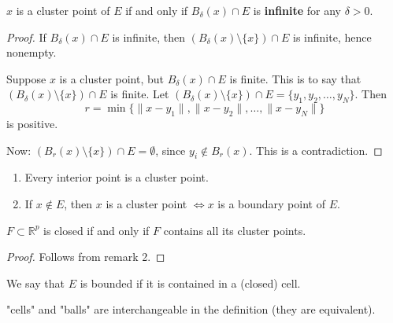 \begin{proposition}
	$x$ is a cluster point of $E$ if and only if $B_{\delta}(x) \cap E$ is \textbf{infinite} for any  $\delta>0$.
\end{proposition}
\begin{proof}
	If $B_\delta(x) \cap E$ is infinite, then $ (B_{\delta}(x) \setminus \{x\} ) \cap E$ is infinite, hence nonempty.

	Suppose $x$ is a cluster point, but $B_{\delta}(x)  \cap E$ is finite. This is to say that $(B_{\delta}(x) \setminus \{x\} ) \cap E$ is finite. 
	Let $(B_{\delta}(x) \setminus \{x\} ) \cap E = \{ y_1,y_2,\ldots,y_N\}$. Then \[
		r = \min \{\|x-y_1\|, \|x-y_2\|,\ldots,\|x-y_N\|\}
	\]
	is positive.
	
	Now:  
	$(B_{r}(x) \setminus \{x\} ) \cap E = \emptyset $, since $y_i \not\in B_r(x)$. This is a contradiction.
\end{proof}

\begin{remark}
	\begin{enumerate}
		\item Every interior point is a cluster point. 
		\item If $x \not\in E$, then $x$ is a cluster point $\iff x$ is a boundary point of $E$.
	\end{enumerate}
\end{remark}

\begin{proposition}
	$F \subset \mathbb{R}^p$ is closed if and only if $F$ contains all its cluster points.
\end{proposition}
\begin{proof}
	Follows from remark 2.
\end{proof}

\begin{definition}
	We say that $E$ is bounded if it is contained in a (closed) cell.
\end{definition}
\begin{remark}
	"cells" and "balls" are interchangeable in the definition (they are equivalent).
\end{remark}


